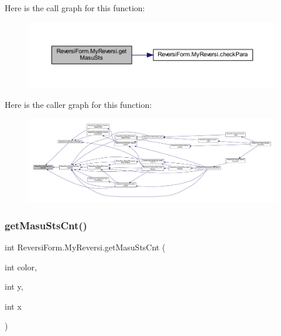Here is the call graph for this function\+:\nopagebreak
\begin{figure}[H]
\begin{center}
\leavevmode
\includegraphics[width=350pt]{class_reversi_form_1_1_my_reversi_ab6498c154199b58c418af1e0058736f6_cgraph}
\end{center}
\end{figure}
Here is the caller graph for this function\+:\nopagebreak
\begin{figure}[H]
\begin{center}
\leavevmode
\includegraphics[width=350pt]{class_reversi_form_1_1_my_reversi_ab6498c154199b58c418af1e0058736f6_icgraph}
\end{center}
\end{figure}
\mbox{\label{class_reversi_form_1_1_my_reversi_a26818336f7915237cf274e1fdff7ec4b}} 
\subsubsection{\texorpdfstring{get\+Masu\+Sts\+Cnt()}{getMasuStsCnt()}}
{\footnotesize\ttfamily int Reversi\+Form.\+My\+Reversi.\+get\+Masu\+Sts\+Cnt (\begin{DoxyParamCaption}\item[{int}]{color,  }\item[{int}]{y,  }\item[{int}]{x }\end{DoxyParamCaption})}



